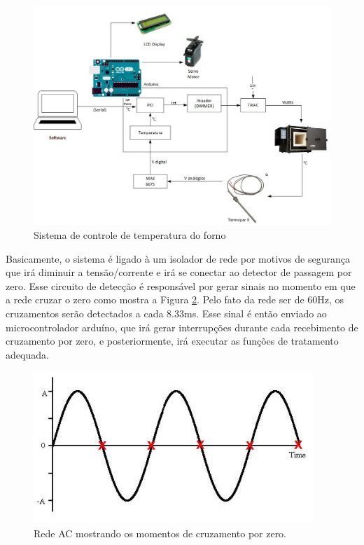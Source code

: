 \begin{figure}[H]
	\centering
	\label{diagrama}
	\includegraphics[keepaspectratio=true,scale=0.5]{figuras/diagrama.jpg}
	\caption{Sistema de controle de temperatura do forno}
\end{figure}

Basicamente, o sistema é ligado à um isolador de rede por motivos de segurança que irá diminuir a tensão/corrente e irá se conectar ao detector de passagem por zero. Esse circuito de detecção é responsável por gerar sinais no momento em que a rede cruzar o zero como mostra a Figura \ref{redeAC}. Pelo fato da rede ser de 60Hz, os cruzamentos serão detectados a cada 8.33ms. Esse sinal é então enviado ao microcontrolador arduíno, que irá gerar interrupções durante cada recebimento de cruzamento por zero, e posteriormente, irá executar as funções de tratamento adequada.

\begin{figure}[H]
	\centering
	\label{redeAC}
	\includegraphics[keepaspectratio=true,scale=1.0]{figuras/redeAC.JPG}
	\caption{Rede AC mostrando os momentos de cruzamento por zero.}
\end{figure}

